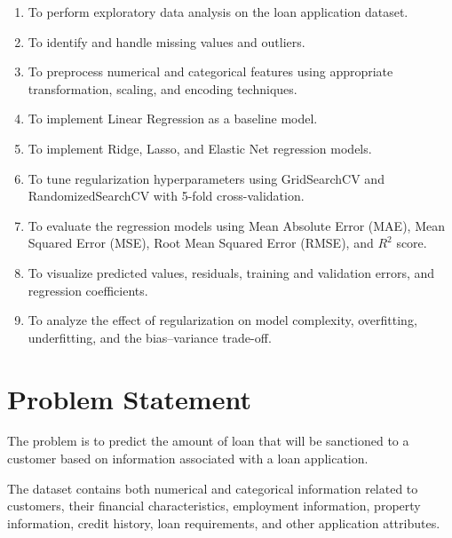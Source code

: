 \documentclass[12pt,a4paper]{article}
\begin{document}
\begin{enumerate}
    \item To perform exploratory data analysis on the loan application
    dataset.
    
    \item To identify and handle missing values and outliers.
    
    \item To preprocess numerical and categorical features using
    appropriate transformation, scaling, and encoding techniques.
    
    \item To implement Linear Regression as a baseline model.
    
    \item To implement Ridge, Lasso, and Elastic Net regression models.
    
    \item To tune regularization hyperparameters using GridSearchCV and
    RandomizedSearchCV with 5-fold cross-validation.
    
    \item To evaluate the regression models using Mean Absolute Error
    (MAE), Mean Squared Error (MSE), Root Mean Squared Error (RMSE),
    and $R^2$ score.
    
    \item To visualize predicted values, residuals, training and
    validation errors, and regression coefficients.
    
    \item To analyze the effect of regularization on model complexity,
    overfitting, underfitting, and the bias--variance trade-off.
\end{enumerate}


\section{Problem Statement}

The problem is to predict the amount of loan that will be sanctioned to a
customer based on information associated with a loan application.

The dataset contains both numerical and categorical information related to
customers, their financial characteristics, employment information,
property information, credit history, loan requirements, and other
application attributes.
\end{document}
